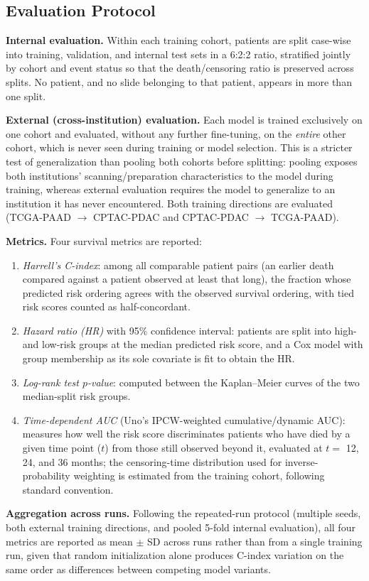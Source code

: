 %

\subsection{Evaluation Protocol}
\label{subsec:evaluation-protocol}

\textbf{Internal evaluation.} Within each training cohort, patients are split
case-wise into training, validation, and internal test sets in a 6:2:2 ratio,
stratified jointly by cohort and event status so that the death/censoring ratio
is preserved across splits. No patient, and no slide belonging to that patient,
appears in more than one split.

\textbf{External (cross-institution) evaluation.} Each model is trained
exclusively on one cohort and evaluated, without any further fine-tuning, on the
\emph{entire} other cohort, which is never seen during training or model
selection. This is a stricter test of generalization than pooling both cohorts
before splitting: pooling exposes both institutions' scanning/preparation
characteristics to the model during training, whereas external evaluation
requires the model to generalize to an institution it has never encountered.
Both training directions are evaluated (TCGA-PAAD $\rightarrow$ CPTAC-PDAC and
CPTAC-PDAC $\rightarrow$ TCGA-PAAD).

\textbf{Metrics.} Four survival metrics are reported:

\begin{enumerate}
  \item \emph{Harrell's C-index}: among all comparable patient pairs (an
    earlier death compared against a patient observed at least that long), the
    fraction whose predicted risk ordering agrees with the observed survival
    ordering, with tied risk scores counted as half-concordant.
  \item \emph{Hazard ratio (HR)} with 95\% confidence interval: patients are
    split into high- and low-risk groups at the median predicted risk score,
    and a Cox model with group membership as its sole covariate is fit to
    obtain the HR.
  \item \emph{Log-rank test $p$-value}: computed between the Kaplan--Meier
    curves of the two median-split risk groups.
  \item \emph{Time-dependent AUC} (Uno's IPCW-weighted cumulative/dynamic
    AUC): measures how well the risk score discriminates patients who have
    died by a given time point ($t$) from those still observed beyond it,
    evaluated at $t = $ 12, 24, and 36 months; the censoring-time distribution
    used for inverse-probability weighting is estimated from the training
    cohort, following standard convention.
\end{enumerate}

\textbf{Aggregation across runs.} Following the repeated-run protocol
(multiple seeds, both external training directions, and pooled 5-fold internal
evaluation), all four metrics are reported as mean $\pm$ SD across runs rather
than from a single training run, given that random initialization alone
produces C-index variation on the same order as differences between competing
model variants.
